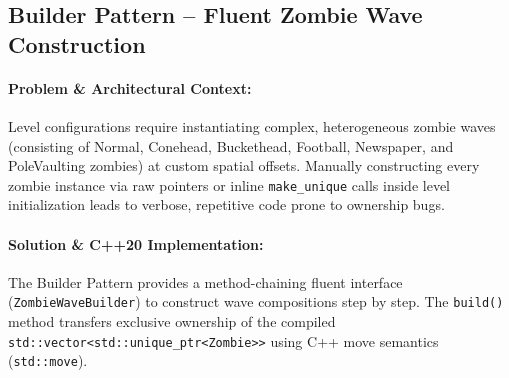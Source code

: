 \documentclass[12pt,a4paper]{article}
\begin{document}
\subsection{Builder Pattern -- Fluent Zombie Wave Construction}

\paragraph{Problem \& Architectural Context:}
Level configurations require instantiating complex, heterogeneous zombie waves (consisting of Normal, Conehead, Buckethead, Football, Newspaper, and PoleVaulting zombies) at custom spatial offsets. Manually constructing every zombie instance via raw pointers or inline \texttt{make\_unique} calls inside level initialization leads to verbose, repetitive code prone to ownership bugs.

\paragraph{Solution \& C++20 Implementation:}
The Builder Pattern provides a method-chaining fluent interface (\texttt{ZombieWaveBuilder}) to construct wave compositions step by step. The \texttt{build()} method transfers exclusive ownership of the compiled \texttt{std::vector<std::unique\_ptr<Zombie>>} using C++ move semantics (\texttt{std::move}).

\begin{center}
\end{center}
\end{document}
